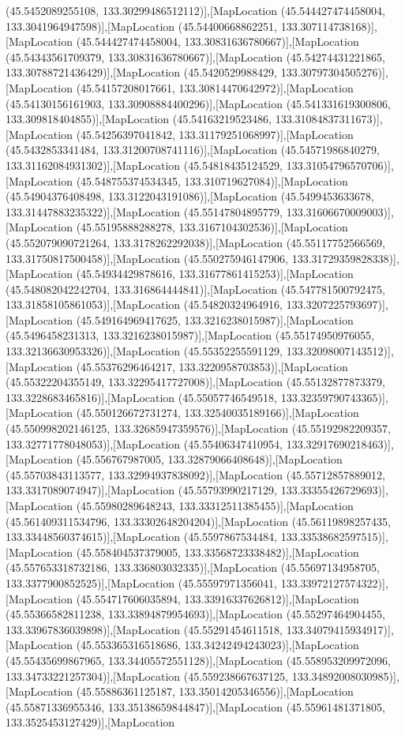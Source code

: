 (45.5452089255108, 133.30299486512112)],[MapLocation (45.544427474458004, 133.3041964947598)],[MapLocation (45.54400668862251, 133.307114738168)],[MapLocation (45.544427474458004, 133.30831636780667)],[MapLocation (45.54343561709379, 133.30831636780667)],[MapLocation (45.54274431221865, 133.30788721436429)],[MapLocation (45.5420529988429, 133.30797304505276)],[MapLocation (45.54157208017661, 133.30814470642972)],[MapLocation (45.54130156161903, 133.30908884400296)],[MapLocation (45.541331619300806, 133.309818404855)],[MapLocation (45.54163219523486, 133.31084837311673)],[MapLocation (45.54256397041842, 133.31179251068997)],[MapLocation (45.5432853341484, 133.31200708741116)],[MapLocation (45.54571986840279, 133.31162084931302)],[MapLocation (45.54818435124529, 133.31054796570706)],[MapLocation (45.548755374534345, 133.310719627084)],[MapLocation (45.54904376408498, 133.3122043191086)],[MapLocation (45.5499453633678, 133.31447883235322)],[MapLocation (45.55147804895779, 133.31606670009003)],[MapLocation (45.55195888288278, 133.3167104302536)],[MapLocation (45.552079090721264, 133.3178262292038)],[MapLocation (45.55117752566569, 133.31750817500458)],[MapLocation (45.550275946147906, 133.31729359828338)],[MapLocation (45.54934429878616, 133.31677861415253)],[MapLocation (45.548082042242704, 133.316864444841)],[MapLocation (45.547781500792475, 133.31858105861053)],[MapLocation (45.54820324964916, 133.3207225793697)],[MapLocation (45.549164969417625, 133.3216238015987)],[MapLocation (45.5496458231313, 133.3216238015987)],[MapLocation (45.55174950976055, 133.32136630953326)],[MapLocation (45.55352255591129, 133.32098007143512)],[MapLocation (45.55376296464217, 133.3220958703853)],[MapLocation (45.55322204355149, 133.32295417727008)],[MapLocation (45.55132877873379, 133.3228683465816)],[MapLocation (45.55057746549518, 133.32359790743365)],[MapLocation (45.550126672731274, 133.32540035189166)],[MapLocation (45.550998202146125, 133.32685947359576)],[MapLocation (45.55192982209357, 133.32771778048053)],[MapLocation (45.55406347410954, 133.32917690218463)],[MapLocation (45.556767987005, 133.32879066408648)],[MapLocation (45.55703843113577, 133.32994937838092)],[MapLocation (45.55712857889012, 133.3317089074947)],[MapLocation (45.55793990217129, 133.33355426729693)],[MapLocation (45.55980289648243, 133.33312511385455)],[MapLocation (45.561409311534796, 133.33302648204204)],[MapLocation (45.56119898257435, 133.33448560374615)],[MapLocation (45.5597867534484, 133.33538682597515)],[MapLocation (45.558404537379005, 133.33568723338482)],[MapLocation (45.557653318732186, 133.336803032335)],[MapLocation (45.55697134958705, 133.3377900852525)],[MapLocation (45.55597971356041, 133.33972127574322)],[MapLocation (45.554717606035894, 133.33916337626812)],[MapLocation (45.55366582811238, 133.33894879954693)],[MapLocation (45.55297464904455, 133.33967836039898)],[MapLocation (45.55291454611518, 133.34079415934917)],[MapLocation (45.553365316518686, 133.34242494243023)],[MapLocation (45.55435699867965, 133.34405572551128)],[MapLocation (45.558953209972096, 133.34733221257304)],[MapLocation (45.559238667637125, 133.34892008030985)],[MapLocation (45.55886361125187, 133.35014205346556)],[MapLocation (45.55871336955346, 133.35138659844847)],[MapLocation (45.55961481371805, 133.3525453127429)],[MapLocation 